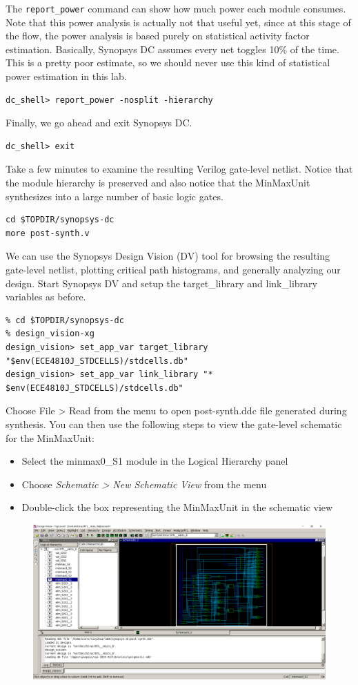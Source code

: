 \documentclass[a4paper,12pt,twoside]{article}
\begin{document}
The \texttt{report\_power} command can show how much power each module consumes. Note that this power analysis is actually not that useful yet, since at this stage of the flow, the power analysis is based purely on statistical activity factor estimation. Basically, Synopsys DC assumes every net toggles 10\% of the time. This is a pretty poor estimate, so we should never use this kind of statistical power estimation in this lab.
\begin{verbatim}
dc_shell> report_power -nosplit -hierarchy
\end{verbatim}
Finally, we go ahead and exit Synopsys DC.
\begin{verbatim}
dc_shell> exit
\end{verbatim}
Take a few minutes to examine the resulting Verilog gate-level netlist. Notice that the module hierarchy is preserved and also notice that the MinMaxUnit synthesizes into a large number of basic logic gates.
\begin{verbatim}
cd $TOPDIR/synopsys-dc
more post-synth.v
\end{verbatim}
We can use the Synopsys Design Vision (DV) tool for browsing the resulting gate-level netlist, plotting critical path histograms, and generally analyzing our design. Start Synopsys DV and setup the target\_library and link\_library variables as before.
\begin{verbatim}
% cd $TOPDIR/synopsys-dc
% design_vision-xg
design_vision> set_app_var target_library "$env(ECE4810J_STDCELLS)/stdcells.db"
design_vision> set_app_var link_library "* $env(ECE4810J_STDCELLS)/stdcells.db"
\end{verbatim}
Choose File > Read from the menu to open post-synth.ddc file generated during synthesis. You can then use the following steps to view the gate-level schematic for the MinMaxUnit:
\begin{itemize}
    \item Select the minmax0\_S1 module in the Logical Hierarchy panel
    \item Choose \textit{Schematic > New Schematic View} from the menu
    \item Double-click the box representing the MinMaxUnit in the schematic view
\end{itemize}
\begin{figure}[H]
    \centering
    \includegraphics[width=\textwidth]{images/9.png}
\end{figure}
\end{document}
